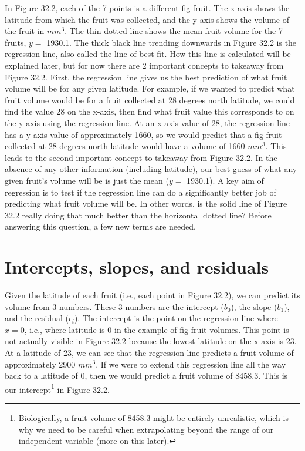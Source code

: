 \documentclass[
  openany]{scrbook}
\begin{document}
In Figure 32.2, each of the 7 points is a different fig fruit.
The x-axis shows the latitude from which the fruit was collected, and the y-axis shows the volume of the fruit in \(mm^{3}\).
The thin dotted line shows the mean fruit volume for the 7 fruits, \(\bar{y} =\) 1930.1.
The thick black line trending downwards in Figure 32.2 is the regression line, also called the line of best fit.
How this line is calculated will be explained later, but for now there are 2 important concepts to takeaway from Figure 32.2.
First, the regression line gives us the best prediction of what fruit volume will be for any given latitude.
For example, if we wanted to predict what fruit volume would be for a fruit collected at 28 degrees north latitude, we could find the value 28 on the x-axis, then find what fruit value this corresponds to on the y-axis using the regression line.
At an x-axis value of 28, the regression line has a y-axis value of approximately 1660, so we would predict that a fig fruit collected at 28 degrees north latitude would have a volume of 1660 \(mm^{3}\).
This leads to the second important concept to takeaway from Figure 32.2.
In the absence of any other information (including latitude), our best guess of what any given fruit's volume will be is just the mean (\(\bar{y} =\) 1930.1).
A key aim of regression is to test if the regression line can do a significantly better job of predicting what fruit volume will be.
In other words, is the solid line of Figure 32.2 really doing that much better than the horizontal dotted line?
Before answering this question, a few new terms are needed.

\hypertarget{intercepts-slopes-and-residuals}{%
\section{Intercepts, slopes, and residuals}\label{intercepts-slopes-and-residuals}}

Given the latitude of each fruit (i.e., each point in Figure 32.2), we can predict its volume from 3 numbers.
These 3 numbers are the intercept (\(b_{0}\)), the slope (\(b_{1}\)), and the residual (\(\epsilon_{i}\)).
The intercept is the point on the regression line where \(x = 0\), i.e., where latitude is 0 in the example of fig fruit volumes.
This point is not actually visible in Figure 32.2 because the lowest latitude on the x-axis is 23.
At a latitude of 23, we can see that the regression line predicts a fruit volume of approximately 2900 \(mm^{3}\).
If we were to extend this regression line all the way back to a latitude of 0, then we would predict a fruit volume of 8458.3.
This is our intercept\footnote{Biologically, a fruit volume of 8458.3 might be entirely unrealistic, which is why we need to be careful when extrapolating beyond the range of our independent variable (more on this later).} in Figure 32.2.
\end{document}
